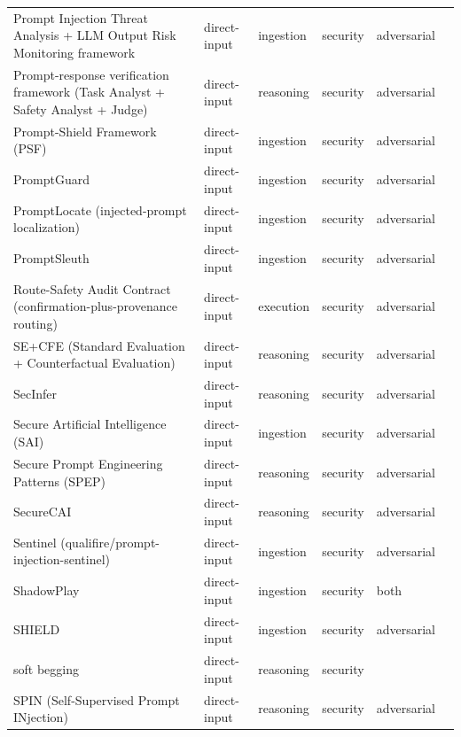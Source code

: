 \begin{longtable}{@{}p{}lllll@{}}
Prompt Injection Threat Analysis + LLM Output Risk Monitoring framework & direct-input & ingestion & security & adversarial & \cite{zhao-2025-novel} \\
Prompt-response verification framework (Task Analyst + Safety Analyst + Judge) & direct-input & reasoning & security & adversarial & \cite{thota-2026-verifying} \\
Prompt-Shield Framework (PSF) & direct-input & ingestion & security & adversarial & \cite{hadiprakoso-2025-adaptive} \\
PromptGuard & direct-input & ingestion & security & adversarial & \cite{alzahrani-2026-promptguard} \\
PromptLocate (injected-prompt localization) & direct-input & ingestion & security & adversarial & \cite{jia-2025-promptlocate} \\
PromptSleuth & direct-input & ingestion & security & adversarial & \cite{wang-2025-promptsleuth} \\
Route-Safety Audit Contract (confirmation-plus-provenance routing) & direct-input & execution & security & adversarial & \cite{tai-2026-brainprompt} \\
SE+CFE (Standard Evaluation + Counterfactual Evaluation) & direct-input & reasoning & security & adversarial & \cite{liu-2025-counterfactual} \\
SecInfer & direct-input & reasoning & security & adversarial & \cite{liu-2025-secinfer} \\
Secure Artificial Intelligence (SAI) & direct-input & ingestion & security & adversarial & \cite{teckani-2025-secure} \\
Secure Prompt Engineering Patterns (SPEP) & direct-input & reasoning & security & adversarial & \cite{sudarsan-2026-secure} \\
SecureCAI & direct-input & reasoning & security & adversarial & \cite{ali-2026-securecai} \\
Sentinel (qualifire/prompt-injection-sentinel) & direct-input & ingestion & security & adversarial & \cite{ivry-2025-sentinel} \\
ShadowPlay & direct-input & ingestion & security & both & \cite{alsobeh-2025-shadowplay} \\
SHIELD & direct-input & ingestion & security & adversarial & \cite{esugo-2025-shield} \\
soft begging & direct-input & reasoning & security &  & \cite{ostermann-2024-soft} \\
SPIN (Self-Supervised Prompt INjection) & direct-input & reasoning & security & adversarial & \cite{zhou-2024-spin} \\

\end{longtable}
